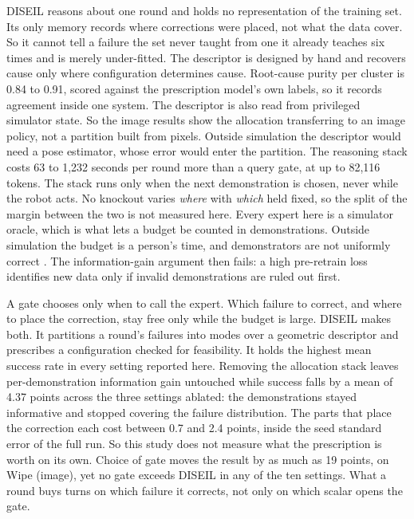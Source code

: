 DISEIL reasons about one round and holds no representation of the training set. Its
only memory records where corrections were placed, not what the data cover. So it
cannot tell a failure the set never taught from one it already teaches six times and
is merely under-fitted. The descriptor is designed by hand and recovers cause only
where configuration determines cause. Root-cause purity per cluster is 0.84 to 0.91,
scored against the prescription model's own labels, so it records agreement inside
one system. The descriptor is also read from privileged simulator state. So
the image results show the allocation transferring to an image policy, not a
partition built from pixels. Outside simulation the descriptor would need a pose
estimator, whose error would enter the partition. The reasoning stack costs 63 to
1{,}232 seconds per round more than a query gate, at up to 82{,}116 tokens. The
stack runs only when the next demonstration is chosen, never while the robot acts.
No knockout varies \emph{where} with \emph{which} held fixed, so the split of the
margin between the two is not measured here. Every expert here is a simulator
oracle, which is what lets a budget be counted in demonstrations. Outside simulation
the budget is a person's time, and demonstrators are not uniformly correct
\cite{belkhale2023dataquality, brown2019trex}. The information-gain argument then
fails: a high pre-retrain loss identifies new data only if invalid demonstrations
are ruled out first.

A gate chooses only when to call the expert. Which failure to correct, and where to
place the correction, stay free only while the budget is large. DISEIL makes both.
It partitions a round's failures into modes over a geometric descriptor and
prescribes a configuration checked for feasibility. It holds the highest mean
success rate in every setting reported here. Removing the allocation stack leaves
per-demonstration information gain untouched while success falls by a mean of 4.37
points across the three settings ablated: the demonstrations stayed informative and
stopped covering the failure distribution. The parts that place the correction each
cost between 0.7 and 2.4 points, inside the seed standard error of the full run. So
this study does not measure what the prescription is worth on its own. Choice of
gate moves the result by as much as 19 points, on Wipe (image), yet no gate exceeds
DISEIL in any of the ten settings. What a round buys turns on which failure it
corrects, not only on which scalar opens the gate.
